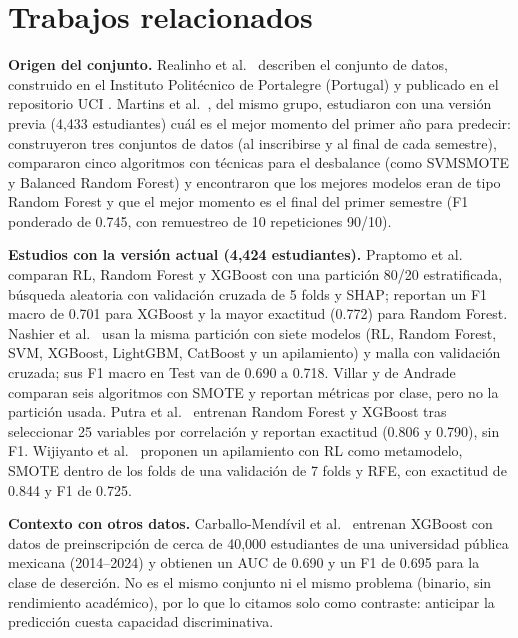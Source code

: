 \documentclass[conference]{IEEEtran}
\begin{document}
\section{Trabajos relacionados}\label{sec:related}
\textbf{Origen del conjunto.} Realinho et al.\ \cite{realinho2022} describen el conjunto de datos, construido en el Instituto Politécnico de Portalegre (Portugal) y publicado en el repositorio UCI \cite{realinho2021uci}. Martins et al.\ \cite{martins2023}, del mismo grupo, estudiaron con una versión previa (4,433 estudiantes) cuál es el mejor momento del primer año para predecir: construyeron tres conjuntos de datos (al inscribirse y al final de cada semestre), compararon cinco algoritmos con técnicas para el desbalance (como SVMSMOTE y Balanced Random Forest) y encontraron que los mejores modelos eran de tipo Random Forest y que el mejor momento es el final del primer semestre (F1 ponderado de 0.745, con remuestreo de 10 repeticiones 90/10).

\textbf{Estudios con la versión actual (4,424 estudiantes).} Praptomo et al.\ \cite{praptomo2026} comparan RL, Random Forest y XGBoost con una partición 80/20 estratificada, búsqueda aleatoria con validación cruzada de 5 folds y SHAP; reportan un F1 macro de 0.701 para XGBoost y la mayor exactitud (0.772) para Random Forest. Nashier et al.\ \cite{nashier2026} usan la misma partición con siete modelos (RL, Random Forest, SVM, XGBoost, LightGBM, CatBoost y un apilamiento) y malla con validación cruzada; sus F1 macro en Test van de 0.690 a 0.718. Villar y de Andrade \cite{villar2024} comparan seis algoritmos con SMOTE y reportan métricas por clase, pero no la partición usada. Putra et al.\ \cite{putra2025} entrenan Random Forest y XGBoost tras seleccionar 25 variables por correlación y reportan exactitud (0.806 y 0.790), sin F1. Wijiyanto et al.\ \cite{wijiyanto2026} proponen un apilamiento con RL como metamodelo, SMOTE dentro de los folds de una validación de 7 folds y RFE, con exactitud de 0.844 y F1 de 0.725.

\textbf{Contexto con otros datos.} Carballo-Mendívil et al.\ \cite{carballo2025} entrenan XGBoost con datos de preinscripción de cerca de 40,000 estudiantes de una universidad pública mexicana (2014--2024) y obtienen un AUC de 0.690 y un F1 de 0.695 para la clase de deserción. No es el mismo conjunto ni el mismo problema (binario, sin rendimiento académico), por lo que lo citamos solo como contraste: anticipar la predicción cuesta capacidad discriminativa.
\end{document}
